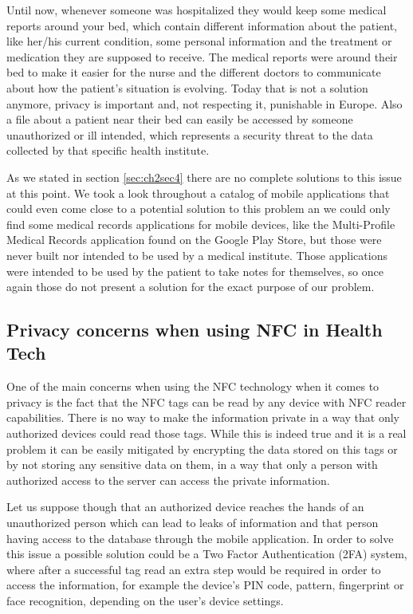 Until now, whenever someone was hospitalized they would keep some medical reports around your bed, which contain different information about the patient, like her/his current condition, some personal information and the treatment or medication they are supposed to receive. The medical reports were around their bed to make it easier for the nurse and the different doctors to communicate about how the patient's situation is evolving. Today that is not a solution anymore, privacy is important and, not respecting it, punishable in Europe. Also a file about a patient near their bed can easily be accessed by someone unauthorized or ill intended, which represents a security threat to the data collected by that specific health institute.

As we stated in section \ref{sec:ch2sec4} there are no complete solutions to this issue at this point. We took a look throughout a catalog of mobile applications that could even come close to a potential solution to this problem an we could only find some medical records applications for mobile devices, like the Multi-Profile Medical Records application found on the Google Play Store, but those were never built nor intended to be used by a medical institute. Those applications were intended to be used by the patient to take notes for themselves, so once again those do not present a solution for the exact purpose of our problem.

\subsection{Privacy concerns when using NFC in Health Tech}
\label{sec:ch2sec5subsec3}

\par One of the main concerns when using the NFC technology when it comes to privacy is the fact that the NFC tags can be read by any device with NFC reader capabilities. There is no way to make the information private in a way that only authorized devices could read those tags. While this is indeed true and it is a real problem it can be easily mitigated by encrypting the data stored on this tags or by not storing any sensitive data on them, in a way that only a person with authorized access to the server can access the private information.

Let us suppose though that an authorized device reaches the hands of an unauthorized person which can lead to leaks of information and that person having access to the database through the mobile application. In order to solve this issue a possible solution could be a Two Factor Authentication (2FA) system, where after a successful tag read an extra step would be required in order to access the information, for example the device's PIN code, pattern, fingerprint or face recognition, depending on the user's device settings.

